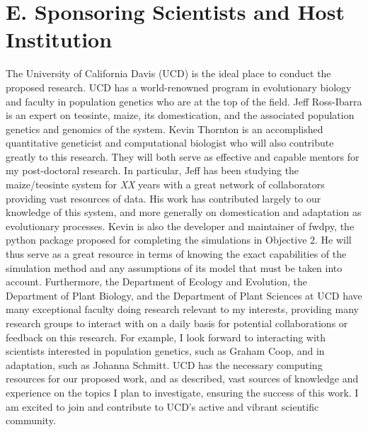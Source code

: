 \section*{E. Sponsoring Scientists and Host Institution}

The University of California Davis (UCD) is the ideal place to conduct the proposed research. UCD has a world-renowned program in evolutionary biology and faculty in population genetics who are at the top of the field. Jeff Ross\--Ibarra is an expert on teosinte, maize, its domestication, and the associated population genetics and genomics of the system.  
Kevin Thornton is an accomplished quantitative geneticist and computational biologist who will also contribute greatly to this research. 
They will both serve as effective and capable mentors for my post-doctoral research. In particular, Jeff has been studying the maize\//teosinte system for \emph{XX} years with a great network of collaborators providing vast resources of data. His work has contributed largely to our knowledge of this system, and more generally on domestication and adaptation as evolutionary processes. Kevin is also the developer and maintainer of fwdpy, the python package proposed for completing the simulations in Objective 2. He will thus serve as a great resource in terms of knowing the exact capabilities of the simulation method and any assumptions of its model that must be taken into account.
Furthermore, the Department of Ecology and Evolution, the Department of Plant Biology, and the Department of Plant Sciences at UCD have many exceptional faculty doing research relevant to my interests, providing many research groups to interact with on a daily basis for potential collaborations or feedback on this research. For example, I look forward to interacting with scientists interested in population genetics, such as Graham Coop, and in adaptation, such as Johanna Schmitt. %
UCD has the necessary computing resources for our proposed work, and as described, vast sources of knowledge and experience on the topics I plan to investigate, ensuring the success of this work. I am excited to join and contribute to UCD's active and vibrant scientific community.


